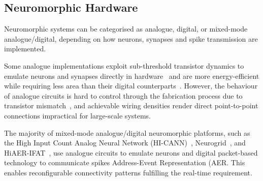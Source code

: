\subsection{Neuromorphic Hardware}
\label{subsec:neuromorphic_hw}
Neuromorphic systems can be categorised as analogue, digital, or mixed-mode analogue/digital, depending on how neurons, synapses and spike transmission are implemented. %
\DIFdelbegin %

\DIFdelend Some analogue implementations exploit sub-threshold transistor dynamics to emulate neurons and synapses directly in hardware~\citep{indiveri2011neuromorphic} and are more energy-efficient while requiring less area than their digital counterparts~\citep{joubert2012hardware}.
However, the behaviour of analogue circuits is hard to control through the fabrication process due to transistor mismatch~\citep{indiveri2011neuromorphic,pedram2006thermal,linares2003compact}, and achievable \DIFdelbegin {}\DIFdelend wiring densities render direct point-to-point connections impractical for large-scale systems.

The majority of mixed-mode analogue/digital neuromorphic platforms, such as the High Input Count Analog Neural Network (HI-CANN)~\citep{schemmel2010wafer}, Neurogrid~\citep{benjamin2014neurogrid}, and HiAER-IFAT~\citep{yu201265k}, use analogue circuits to emulate neurons and digital packet-based technology to communicate spikes \DIFdelbegin {}\DIFdelend \DIFaddbegin {}\DIFaddend Address-Event Representation (AER\DIFdelbegin {}\DIFdelend \DIFaddbegin {}\DIFaddend .
This enables reconfigurable connectivity patterns \DIFdelbegin {}\DIFdelend \DIFaddbegin {}\DIFaddend fulfilling the real-time requirement.

